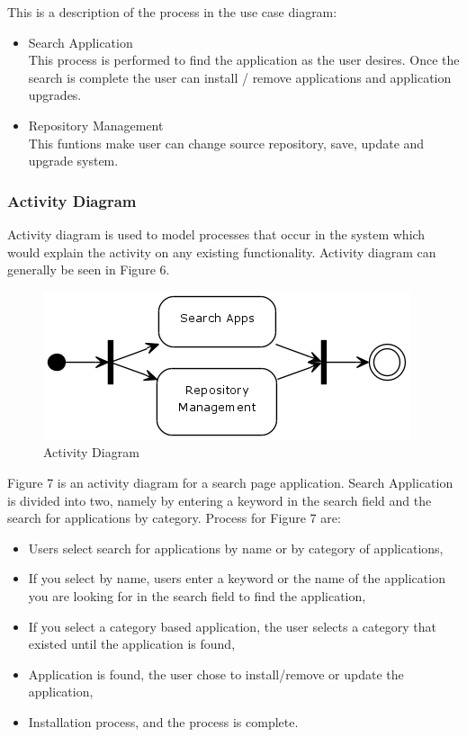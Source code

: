 \documentclass[conference, letterpaper]{IEEEtran}
\begin{document}
This is a description of the process in the use case diagram:
\begin{itemize}
\item Search Application\\
This process is performed to find the application as the user desires. Once the search is complete the user can install / remove applications and application upgrades.
\item Repository Management\\
This funtions make user can change source repository, save, update and upgrade system.
\end{itemize}

\subsubsection{Activity Diagram}
Activity diagram is used to model processes that occur in the system which would explain the activity on any existing functionality. Activity diagram can generally be seen in Figure 6.

\begin{figure}[!t]
\centering
\includegraphics[scale=0.7]{image/ActivityDiagram.png}
\caption{Activity Diagram}
\end{figure}

Figure 7 is an activity diagram for a search page application. Search Application is divided into two, namely by entering a keyword in the search field and the search for applications by category. Process for Figure 7 are:
\begin{itemize}
\item Users select search for applications by name or by category of applications,
\item If you select by name, users enter a keyword or the name of the application you are looking for in the search field to find the application,
\item If you select a category based application, the user selects a category that existed until the application is found,
\item Application is found, the user chose to install/remove or update the application,
\item Installation process, and the process is complete.
\end{itemize}
\end{document}
